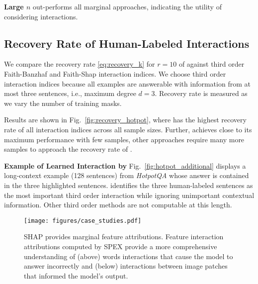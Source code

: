 \textbf{Large $n$ } \SpecExp{} out-performs all marginal approaches, indicating the utility of considering interactions.
%

\vspace{-10pt}
\subsection{Recovery Rate of Human-Labeled Interactions}

%
We compare the recovery rate \eqref{eq:recovery_k} for $r = 10$ of \SpecExp{} against third order Faith-Banzhaf and Faith-Shap interaction indices. 
%
We choose third order interaction indices because all examples 
are answerable with information from at most three sentences, i.e., maximum degree $d = 3$.
%
Recovery rate is measured as we vary the number of training masks. 

Results are shown in Fig.~\ref{fig:recovery_hotpot}, where \SpecExp{} has the highest recovery rate of all interaction indices across all sample sizes. 
%
Further, \SpecExp{} achieves close to its maximum performance with few samples, other approaches require many more samples to approach the recovery rate of \SpecExp{}. 

\textbf{Example of Learned Interaction by \SpecExp{}} Fig.~\ref{fig:hotpot_additional} displays a long-context example (128 sentences) from \emph{HotpotQA} whose answer is contained in the three highlighted sentences. 
%
\SpecExp{} identifies the three human-labeled sentences as the most important third order interaction while ignoring unimportant contextual information. 
%
Other third order methods are not computable at this length. 
%

\begin{figure*}[t]
    \centering
    \texttt{[image: figures/case\_studies.pdf]}
    \caption{SHAP provides marginal feature attributions. Feature interaction attributions computed by SPEX provide a more comprehensive understanding of (above) words interactions that cause the model to answer incorrectly and (below) interactions between image patches that informed the model's output.}
    \label{fig:caseStudies}
\end{figure*}

